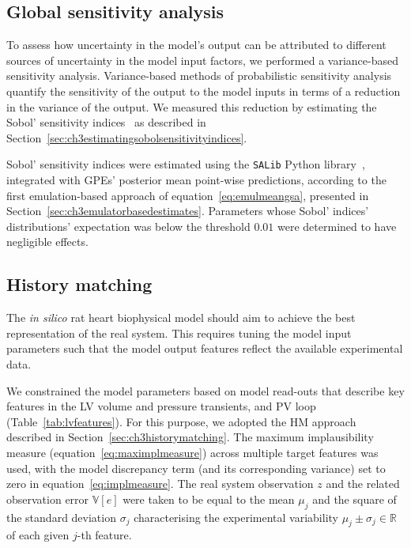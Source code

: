%
%
%
\subsection{Global sensitivity analysis}
To assess how uncertainty in the model's output can be attributed to different sources of uncertainty in the model input factors, we performed a variance-based sensitivity analysis. Variance-based methods of probabilistic sensitivity analysis quantify the sensitivity of the output to the model inputs in terms of a reduction in the variance of the output. We measured this reduction by estimating the Sobol' sensitivity indices~\cite{Sobol:2001} as described in Section~\ref{sec:ch3estimatingsobolsensitivityindices}.

\vspace{0.2cm}
Sobol' sensitivity indices were estimated using the \texttt{SALib} Python library~\cite{Herman:2017}, integrated with GPEs' posterior mean point-wise predictions, according to the first emulation-based approach of equation~\eqref{eq:emulmeangsa}, presented in Section~\ref{sec:ch3emulatorbasedestimates}. Parameters whose Sobol' indices' distributions' expectation was below the threshold $0.01$ were determined to have negligible effects.


%
%
%
\subsection{History matching}\label{sec:ch4historymatching}
The \textit{in silico} rat heart biophysical model should aim to achieve the best representation of the real system. This requires tuning the model input parameters such that the model output features reflect the available experimental data.

\vspace{0.2cm}
We constrained the model parameters based on model read-outs that describe key features in the LV volume and pressure transients, and PV loop (Table~\ref{tab:lvfeatures}). For this purpose, we adopted the HM approach described in Section~\ref{sec:ch3historymatching}. The maximum implausibility measure (equation~\eqref{eq:maximplmeasure}) across multiple target features was used, with the model discrepancy term (and its corresponding variance) set to zero in equation~\eqref{eq:implmeasure}. The real system observation $z$ and the related observation error $\mathbb{V}[e]$ were taken to be equal to the mean $\mu_j$ and the square of the standard deviation $\sigma_j$ characterising the experimental variability $\mu_j\pm\sigma_j\in\mathbb{R}$ of each given $j$-th feature.

